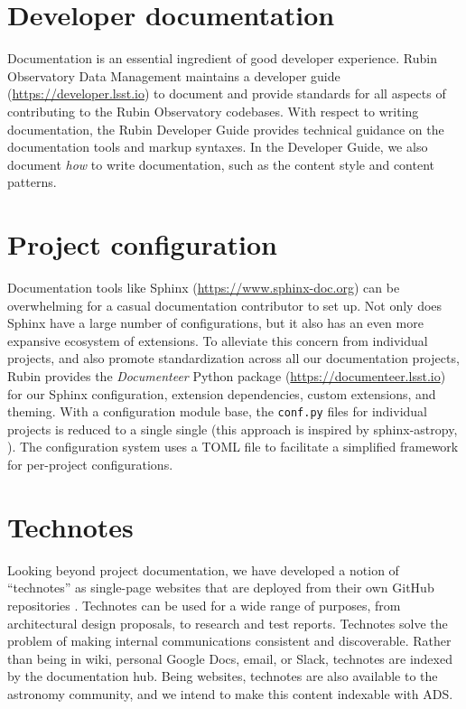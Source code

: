 \documentclass[11pt,twoside]{article}
\begin{document}
\section{Developer documentation}

Documentation is an essential ingredient of good developer experience.
Rubin Observatory Data Management maintains a developer guide (\url{https://developer.lsst.io}) to document and provide standards for all aspects of contributing to the Rubin Observatory codebases.
With respect to writing documentation, the Rubin Developer Guide provides technical guidance on the documentation tools and markup syntaxes.
In the Developer Guide, we also document \emph{how} to write documentation, such as the content style and content patterns.

\section{Project configuration}

Documentation tools like Sphinx (\url{https://www.sphinx-doc.org}) can be overwhelming for a casual documentation contributor to set up.
Not only does Sphinx have a large number of configurations, but it also has an even more expansive ecosystem of extensions.
To alleviate this concern from individual projects, and also promote standardization across all our documentation projects, Rubin provides the \textit{Documenteer} Python package (\url{https://documenteer.lsst.io}) for our Sphinx configuration, extension dependencies, custom extensions, and theming.
With a configuration module base, the \texttt{conf.py} files for individual projects is reduced to a single single (this approach is inspired by sphinx-astropy, \citet{thomas_robitaille_2023_8015243}).
The configuration system uses a TOML file to facilitate a simplified framework for per-project configurations.


\label{sec:technotes}
\section{Technotes}

Looking beyond project documentation, we have developed a notion of ``technotes'' as single-page websites that are deployed from their own GitHub repositories \citep{SQR-000}.
Technotes can be used for a wide range of purposes, from architectural design proposals, to research and test reports.
Technotes solve the problem of making internal communications consistent and discoverable.
Rather than being in wiki, personal Google Docs, email, or Slack, technotes are indexed by the documentation hub.
Being websites, technotes are also available to the astronomy community, and we intend to make this content indexable with ADS.
\end{document}
